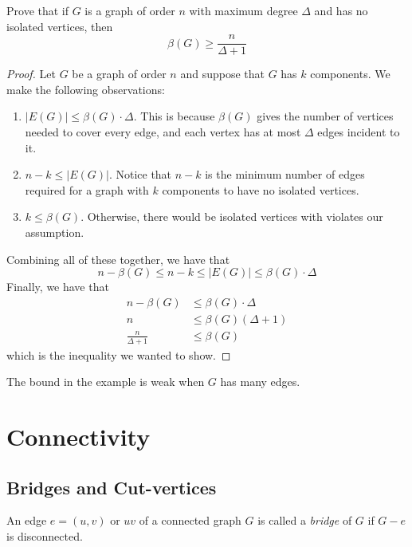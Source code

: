 \begin{nexample}
  Prove that if \(G\) is a graph of order \(n\) with maximum degree \(\Delta\)
  and has no isolated vertices, then 
  \[ \beta(G) \geq \frac{n}{\Delta + 1} \]

  \begin{proof}
    Let \(G\) be a graph of order \(n\) and suppose that \(G\) has \(k\)
    components. We make the following observations:
    \begin{enumerate}
      \item \(|E(G)| \leq \beta(G) \cdot \Delta\). This is because
        \(\beta(G)\) gives the number of vertices needed to cover every edge,
        and each vertex has at most \(\Delta\) edges incident to it.
      \item \(n-k \leq |E(G)|\). Notice that \(n-k\) is the minimum number of
        edges required for a graph with \(k\) components to have no isolated
        vertices.
      \item \(k \leq \beta(G)\). Otherwise, there would be isolated vertices
        with violates our assumption.
    \end{enumerate}
    Combining all of these together, we have that
    \[ n-\beta(G) \leq n-k \leq |E(G)| \leq \beta(G) \cdot \Delta \]
    Finally, we have that 
    \[
    \begin{aligned}
      n - \beta(G) &\leq \beta(G) \cdot \Delta \\ 
      n &\leq \beta(G) (\Delta + 1) \\ 
      \frac{n}{\Delta + 1} &\leq \beta(G)
    \end{aligned}
    \]
    which is the inequality we wanted to show.
  \end{proof}
\end{nexample}

\begin{remark}
  The bound in the example is weak when \(G\) has many edges. 
\end{remark}

\chapter{Connectivity}

\section{Bridges and Cut-vertices}

\begin{definition}[Bridge]
  An edge \(e = (u, v)\) or \(uv\) of a connected graph \(G\) is
  called a \textit{bridge} of \(G\) if \(G - e\) is disconnected.
\end{definition}

